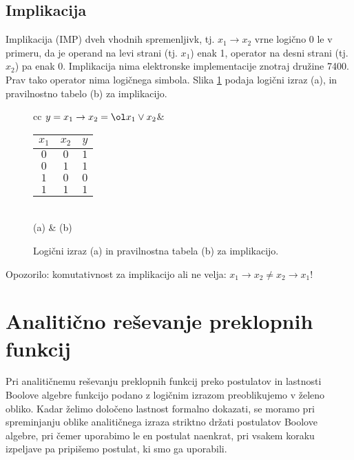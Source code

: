 \subsection{Implikacija }

Implikacija (IMP) dveh vhodnih spremenljivk, tj. $x_1 \rightarrow x_2$  vrne logično 0 le v primeru, da je operand na levi strani (tj. $x_1$) enak 1, operator na desni strani (tj. $x_2$) pa enak 0. Implikacija nima elektronske implementacije znotraj družine 7400. Prav tako operator nima logičnega simbola. Slika \ref{fig:imp} podaja logični izraz (a), in pravilnostno tabelo (b) za implikacijo.

\begin{figure}[ht]
\begin{center}
\begin{tabular}{cc}
$y = x_1 \rightarrow x_2 = \ol x_1 \vee x_2$&
\begin{tabular}{cc|c}
$x_1$ & $x_2$ & $y$\\
\hline
$0$ & $0$ & $1$\\
$0$ & $1$ & $1$\\
$1$ & $0$ & $0$\\
$1$ & $1$ & $1$
\end{tabular}\\
(a) & (b) 
\end{tabular}	
\caption{Logični izraz (a) in pravilnostna tabela (b) za implikacijo.}
\label{fig:imp}
\end{center}
\end{figure}

Opozorilo: komutativnost za implikacijo ali ne velja: $x_1 \rightarrow x_2 \neq x_2 \rightarrow x_1$!


\section{Analitično reševanje preklopnih funkcij}

Pri analitičnemu reševanju preklopnih funkcij preko postulatov in lastnosti Boolove algebre funkcijo podano z logičnim izrazom preoblikujemo v želeno obliko. Kadar želimo določeno lastnost formalno dokazati, se moramo pri spreminjanju oblike analitičnega izraza striktno držati postulatov Boolove algebre, pri čemer uporabimo le en postulat naenkrat, pri vsakem koraku izpeljave pa pripišemo postulat, ki smo ga uporabili. 


